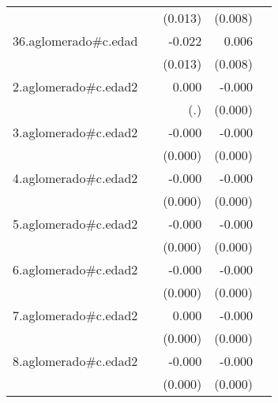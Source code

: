 {\begin{longtable}{l*{4}{D{.}{.}{-1}}}
            &                     &     (0.013)         &     (0.008)         &                     \\
\addlinespace
36.aglomerado#c.edad&                     &      -0.022         &       0.006         &                     \\
            &                     &     (0.013)         &     (0.008)         &                     \\
\addlinespace
2.aglomerado#c.edad2&                     &       0.000         &      -0.000         &                     \\
            &                     &         (.)         &     (0.000)         &                     \\
\addlinespace
3.aglomerado#c.edad2&                     &      -0.000         &      -0.000         &                     \\
            &                     &     (0.000)         &     (0.000)         &                     \\
\addlinespace
4.aglomerado#c.edad2&                     &      -0.000         &      -0.000\sym{***}&                     \\
            &                     &     (0.000)         &     (0.000)         &                     \\
\addlinespace
5.aglomerado#c.edad2&                     &      -0.000         &      -0.000\sym{*}  &                     \\
            &                     &     (0.000)         &     (0.000)         &                     \\
\addlinespace
6.aglomerado#c.edad2&                     &      -0.000         &      -0.000\sym{*}  &                     \\
            &                     &     (0.000)         &     (0.000)         &                     \\
\addlinespace
7.aglomerado#c.edad2&                     &       0.000         &      -0.000         &                     \\
            &                     &     (0.000)         &     (0.000)         &                     \\
\addlinespace
8.aglomerado#c.edad2&                     &      -0.000         &      -0.000         &                     \\
            &                     &     (0.000)         &     (0.000)         &                     \\

\end{longtable}}
